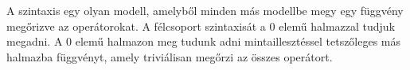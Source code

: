 A szintaxis egy olyan modell, amelyből minden más modellbe megy egy függvény megőrizve az operátorokat. A félcsoport szintaxisát a 0 elemű halmazzal tudjuk megadni. A 0 elemű halmazon meg tudunk adni mintaillesztéssel tetszőleges más halmazba függvényt, amely triviálisan megőrzi az összes operátort. 
\begin{code}%
\>[0]\AgdaSpace{}%
\AgdaSpace{}%
\AgdaSymbol{:}\AgdaSpace{}%
\AgdaSpace{}%
\<%
\\
%
\\[\AgdaEmptyExtraSkip]%
\>[0]\AgdaSpace{}%
\AgdaSymbol{:}\AgdaSpace{}%
\<%
\\
\>[0]%
\>[124I]\AgdaSymbol{=}\AgdaSpace{}%
\<%
\\
\>[.][@{}l@{}]\<[124I]%
\>[2]\AgdaSymbol{\{}\AgdaSpace{}%
\AgdaSpace{}%
\AgdaSymbol{=}\AgdaSpace{}%
\<%
\\
%
\>[2]\AgdaSymbol{;}\AgdaSpace{}%
\AgdaSpace{}%
\AgdaSymbol{=}\AgdaSpace{}%
\AgdaSpace{}%
\AgdaSpace{}%
\AgdaSpace{}%
\AgdaSpace{}%
\<%
\\
%
\>[2]\AgdaSymbol{;}\AgdaSpace{}%
\AgdaSpace{}%
\AgdaSymbol{=}\AgdaSpace{}%
\AgdaSpace{}%
\AgdaSpace{}%
\AgdaSpace{}%
\AgdaSpace{}%
\AgdaSpace{}%
\<%
\\
%
\>[2]\AgdaSymbol{\}}\<%
\end{code}
